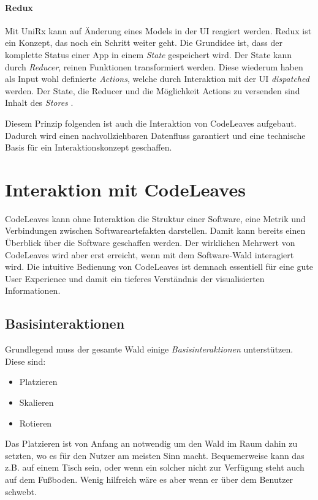 \subsubsection*{Redux}
Mit UniRx kann auf Änderung eines Models in der UI reagiert werden. Redux ist ein Konzept, das noch ein Schritt weiter geht. Die Grundidee ist, dass der komplette Status einer App in einem \textit{State} gespeichert wird. Der State kann durch \textit{Reducer}, reinen Funktionen transformiert werden. Diese wiederum haben als Input wohl definierte \textit{Actions}, welche durch Interaktion mit der UI \textit{dispatched} werden. Der State, die Reducer und die Möglichkeit Actions zu versenden sind Inhalt des \textit{Stores} \cite{abramov2017redux}.

Diesem Prinzip folgenden ist auch die Interaktion von CodeLeaves aufgebaut. Dadurch wird einen nachvollziehbaren Datenfluss garantiert und eine technische Basis für ein Interaktionskonzept geschaffen.

\chapter{Interaktion mit CodeLeaves}
\label{sec:interaction}

CodeLeaves kann ohne Interaktion die Struktur einer Software, eine Metrik und Verbindungen zwischen Softwareartefakten darstellen. Damit kann bereits einen Überblick über die Software geschaffen werden. Der wirklichen Mehrwert von CodeLeaves wird aber erst erreicht, wenn mit dem Software-Wald interagiert wird. Die intuitive Bedienung von CodeLeaves ist demnach essentiell für eine gute User Experience und damit ein tieferes Verständnis der visualisierten Informationen.

\section{Basisinteraktionen}
Grundlegend muss der gesamte Wald einige \textit{Basisinteraktionen} unterstützen. Diese sind:

\begin{itemize}
  \item Platzieren
  \item Skalieren
  \item Rotieren
\end{itemize}

Das Platzieren ist von Anfang an notwendig um den Wald im Raum dahin zu setzten, wo es für den Nutzer am meisten Sinn macht. Bequemerweise kann das z.B. auf einem Tisch sein, oder wenn ein solcher nicht zur Verfügung steht auch auf dem Fußboden. Wenig hilfreich wäre es aber wenn er über dem Benutzer schwebt.

